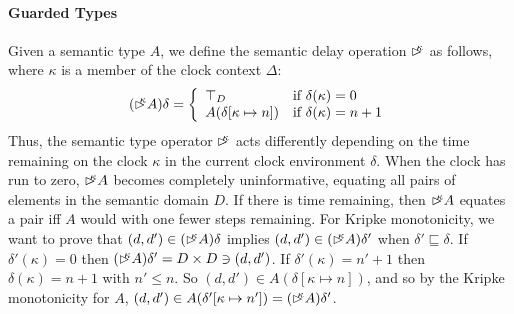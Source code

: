 
\paragraph{Guarded Types} Given a semantic type $A$, we define the
semantic delay operation $\mathord{\rhd\kern-0.4em^{\kappa}}$ as follows, where $\kappa$ is
a member of the clock context $\Delta$:
\begin{displaymath}
  (\mathord{\rhd\kern-0.4em^{\kappa}} A)\delta = \left\{
    \begin{array}{ll}
      \top_D & \textrm{if }\delta(\kappa) = 0 \\
      A(\delta[\kappa \mapsto n]) & \textrm{if }\delta(\kappa) = n + 1
    \end{array}
  \right.
\end{displaymath}
Thus, the semantic type operator $\mathord{\rhd\kern-0.4em^{\kappa}}$ acts differently
depending on the time remaining on the clock $\kappa$ in the current
clock environment $\delta$. When the clock has run to zero,
$\mathord{\rhd\kern-0.4em^{\kappa}} A$ becomes completely uninformative, equating all pairs
of elements in the semantic domain $D$. If there is time remaining,
then $\mathord{\rhd\kern-0.4em^{\kappa}} A$ equates a pair iff $A$ would with one fewer
steps remaining. 
For Kripke monotonicity, we want to prove that
$(d,d') \in (\mathord{\rhd\kern-0.4em^{\kappa}} A)\delta$ implies $(d,d') \in (\mathord{\rhd\kern-0.4em^{\kappa}}
A)\delta'$ when $\delta' \sqsubseteq \delta$. If $\delta'(\kappa) = 0$
then $(\mathord{\rhd\kern-0.4em^{\kappa}} A)\delta' = D \times D \ni (d,d')$. If
$\delta'(\kappa) = n' + 1$ then $\delta(\kappa) = n + 1$ with $n' \leq
n$. So $(d,d') \in A(\delta[\kappa \mapsto n])$, and so by the Kripke
monotonicity for $A$, $(d,d') \in A(\delta'[\kappa \mapsto n']) =
(\mathord{\rhd\kern-0.4em^{\kappa}} A)\delta'$.

